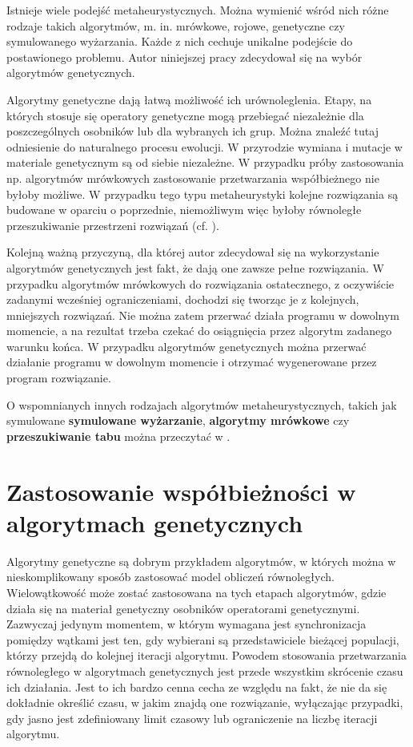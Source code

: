 Istnieje wiele podejść metaheurystycznych. Można wymienić wśród nich różne rodzaje takich algorytmów, m. in. mrówkowe, rojowe, genetyczne czy symulowanego wyżarzania. Każde z nich cechuje unikalne podejście do postawionego problemu. Autor niniejszej pracy zdecydował się na wybór algorytmów genetycznych.

Algorytmy genetyczne dają łatwą możliwość ich urównoleglenia. Etapy, na których stosuje się operatory genetyczne mogą przebiegać niezależnie dla poszczególnych osobników lub dla wybranych ich grup. Można znaleźć tutaj odniesienie do naturalnego procesu ewolucji. W przyrodzie wymiana i mutacje w materiale genetycznym są od siebie niezależne. W przypadku próby zastosowania np. algorytmów mrówkowych zastosowanie przetwarzania współbieżnego nie byłoby możliwe. W przypadku tego typu metaheurystyki kolejne rozwiązania są budowane w oparciu o poprzednie, niemożliwym więc byłoby równoległe przeszukiwanie przestrzeni rozwiązań (cf. \cite{EssentialsOfMetaheuristics}).

Kolejną ważną przyczyną, dla której autor zdecydował się na wykorzystanie algorytmów genetycznych jest fakt, że dają one zawsze pełne rozwiązania. W przypadku algorytmów mrówkowych do rozwiązania ostatecznego, z oczywiście zadanymi wcześniej ograniczeniami, dochodzi się tworząc je z kolejnych, mniejszych rozwiązań. Nie można zatem przerwać działa programu w dowolnym momencie, a na rezultat trzeba czekać do osiągnięcia przez algorytm zadanego warunku końca. W przypadku algorytmów genetycznych można przerwać działanie programu w dowolnym momencie i otrzymać wygenerowane przez program rozwiązanie.

O wspomnianych innych rodzajach algorytmów metaheurystycznych, takich jak symulowane \textbf{symulowane wyżarzanie}, \textbf{algorytmy mrówkowe} czy \textbf{przeszukiwanie tabu} można przeczytać w \cite{SimulatedAnnealing, Ant, TabuSearch}.

\section{Zastosowanie współbieżności w algorytmach genetycznych}

Algorytmy genetyczne są dobrym przykładem algorytmów, w których można w nieskomplikowany sposób zastosować model obliczeń równoległych. Wielowątkowość może zostać zastosowana na tych etapach algorytmów, gdzie działa się na materiał genetyczny osobników operatorami genetycznymi. Zazwyczaj jedynym momentem, w którym wymagana jest synchronizacja pomiędzy wątkami jest ten, gdy wybierani są przedstawiciele bieżącej populacji, którzy przejdą do kolejnej iteracji algorytmu. Powodem stosowania przetwarzania równoległego w algorytmach genetycznych jest przede wszystkim skrócenie czasu ich działania. Jest to ich bardzo cenna cecha ze względu na fakt, że nie da się dokładnie określić czasu, w jakim znajdą one rozwiązanie, wyłączając przypadki, gdy jasno jest zdefiniowany limit czasowy lub ograniczenie na liczbę iteracji algorytmu.

